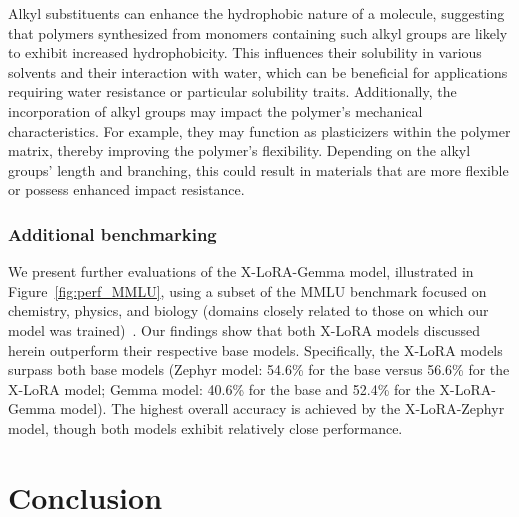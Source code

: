 Alkyl substituents can enhance the hydrophobic nature of a molecule, suggesting that polymers synthesized from monomers containing such alkyl groups are likely to exhibit increased hydrophobicity. This influences their solubility in various solvents and their interaction with water, which can be beneficial for applications requiring water resistance or particular solubility traits. Additionally, the incorporation of alkyl groups may impact the polymer's mechanical characteristics. For example, they may function as plasticizers within the polymer matrix, thereby improving the polymer's flexibility. Depending on the alkyl groups' length and branching, this could result in materials that are more flexible or possess enhanced impact resistance.

\subsubsection{Additional benchmarking} We present further evaluations of the X-LoRA-Gemma model, illustrated in Figure~\ref{fig:perf_MMLU}, using a subset of the MMLU benchmark focused on chemistry, physics, and biology (domains closely related to those on which our model was trained)~\cite{Hendrycks2020MeasuringUnderstanding}. Our findings show that both X-LoRA models discussed herein outperform their respective base models. Specifically, the X-LoRA models surpass both base models (Zephyr model: 54.6\% for the base versus 56.6\% for the X-LoRA model; Gemma model: 40.6\% for the base and 52.4\% for the X-LoRA-Gemma model). The highest overall accuracy is achieved by the X-LoRA-Zephyr model, though both models exhibit relatively close performance.

\section{Conclusion}

